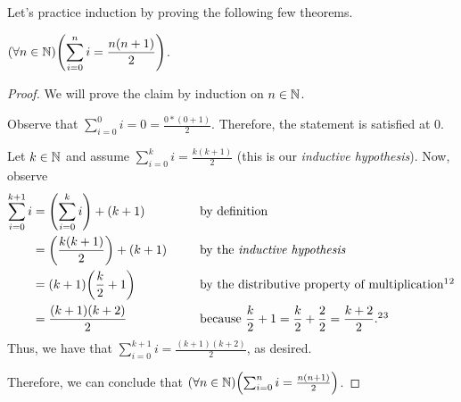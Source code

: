 \newpage

Let's practice induction by proving the following few theorems.

\begin{lemma}\label{thm:gaussiansum}
    $\displaystyle \pn*{\forall n \in \N}\pn*{\sum_{i = 0}^{n}i = \frac{n(n + 1)}{2}}$.
\end{lemma}
\begin{proof}
    We will prove the claim by induction on $n \in \mathbb{N}$.
    \begin{case}
        Observe that $\displaystyle \sum_{i = 0}^{0}i = 0 = \frac{0*(0 + 1)}{2}$.
        Therefore, the statement is satisfied at $0$.
    \end{case}
    \begin{case}
        Let $k \in \mathbb{N}$ and assume $\displaystyle \sum_{i = 0}^{k}i = \frac{k(k + 1)}{2}$
        (this is our \emph{inductive hypothesis}).
        Now, observe
        \begin{alignat*}{2}
            \sum_{i = 0}^{k + 1}i &= \pn*{\sum_{i = 0}^{k}i} + (k + 1) &&\text{ by definition}\\
                                  &= \pn*{\frac{k(k + 1)}{2}} + (k + 1)~~~~&&\text{ by the \emph{inductive hypothesis}}\\
                                  &= (k + 1)\pn*{\frac{k}{2} + 1} &&\text{ by the distributive property of multiplication}\footnotemark[1]\footnotemark[2]\\
                                  &= \frac{(k + 1)(k + 2)}{2} &&\text{ because } \frac{k}{2} + 1 = \frac{k}{2} + \frac{2}{2} = \frac{k + 2}{2}.\footnotemark[2]\footnotemark[3]
        \end{alignat*}
        Thus, we have that $\displaystyle \sum_{i = 0}^{k + 1}i = \frac{(k + 1)(k + 2)}{2}$, as desired.
    \end{case}
    Therefore, we can conclude that $\pn*{\forall n \in \N}\pn*{\sum_{i = 0}^{n}i = \frac{n(n + 1)}{2}}$.
\end{proof}

